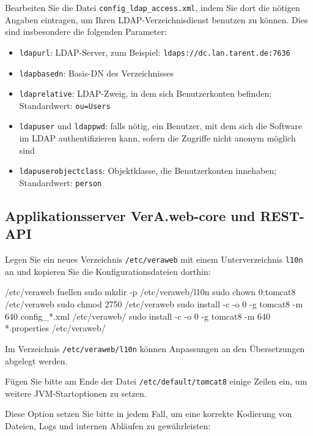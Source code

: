 Bearbeiten Sie die Datei \texttt{config\_ldap\_access.xml}, indem Sie
dort die nötigen Angaben eintragen, um Ihren LDAP-Verzeichnisdienst
benutzen zu können. Dies sind insbesondere die folgenden Parameter:\keinumbruch

\begin{itemize}
 \item{\texttt{ldapurl}: LDAP-Server, zum Beispiel:
  \texttt{ldaps://dc.lan.tarent.de:7636}}
 \item{\texttt{ldapbasedn}: Basis-DN des Verzeichnisses}
 \item{\texttt{ldaprelative}: LDAP-Zweig, in dem sich Benutzerkonten
  befinden; Standardwert: \texttt{ou=Users}}
 \item{\texttt{ldapuser} und \texttt{ldappwd}: falls nötig, ein
  Benutzer, mit dem sich die Software im LDAP authentifizieren kann,
  sofern die Zugriffe nicht anonym möglich sind}
 \item{\texttt{ldapuserobjectclass}: Objektklasse, die Benutzerkonten
  innehaben; Standardwert: \texttt{person}}
\end{itemize}

\subsection{Applikationsserver VerA.web-core und REST-API}\label{subsec:setup-core-tomcat}

\begin{minipage}{\linewidth}
Legen Sie ein neues Verzeichnis \texttt{/etc/veraweb} mit einem
Unterverzeichnis \texttt{l10n} an und kopieren Sie die
Konfigurationsdateien dorthin:

\begin{lstdump}{/etc/veraweb fuellen}
sudo mkdir -p /etc/veraweb/l10n
sudo chown 0:tomcat8 /etc/veraweb
sudo chmod 2750 /etc/veraweb
sudo install -c -o 0 -g tomcat8 -m 640 config_*.xml /etc/veraweb/
sudo install -c -o 0 -g tomcat8 -m 640 *.properties /etc/veraweb/
\end{lstdump}
\end{minipage}

Im Verzeichnis \texttt{/etc/veraweb/l10n} können Anpassungen an
den Übersetzungen abgelegt werden. %

Fügen Sie bitte am Ende der Datei \texttt{/etc/default/tomcat8}
einige Zeilen ein, um weitere JVM-Startoptionen zu setzen.

\begin{minipage}{\linewidth}
Diese Option setzen Sie bitte in jedem Fall, um eine korrekte
Kodierung von Dateien, Logs und internen Abläufen zu gewährleisten:

\end{minipage}

